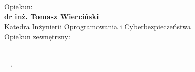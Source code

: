 
{\large  Opiekun:}\\[.5cm]
{\large \bfseries{dr inż. Tomasz Wierciński}}\\[.5cm]
{Katedra Inżynierii Oprogramowania i Cyberbezpieczeństwa}\\[1cm]


\ifdefined\supExt
    {\large Opiekun zewnętrzny:}\\[.5cm]
    {\large \bfseries{\supExt}}\\[.5cm]
    \departmentnameExt
\fi

~\vfill
\placesubmit, \yearsubmit\\

\endgroup

